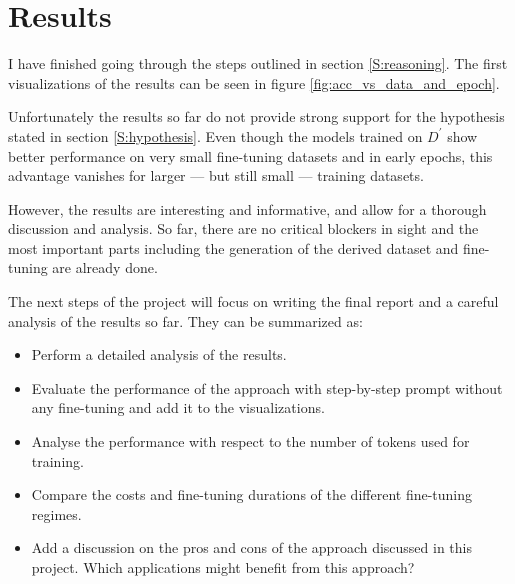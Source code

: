 \documentclass[11pt]{article}
\begin{document}
    \section{Results}

    I have finished going through the steps outlined in section \ref{S:reasoning}.
    The first visualizations of the results can be seen in figure \ref{fig:acc_vs_data_and_epoch}.

    Unfortunately the results so far do not provide strong support for the hypothesis stated in section \ref{S:hypothesis}.
    Even though the models trained on $D^\prime$ show better performance on very small fine-tuning datasets and in early
    epochs, this advantage vanishes for larger --- but still small --- training datasets.

    However, the results are interesting and informative, and allow for a thorough discussion and analysis.
    So far, there are no critical blockers in sight and the most important parts including the generation of the derived
    dataset and fine-tuning are already done.

    The next steps of the project will focus on writing the final report and a careful analysis of the results so far.
    They can be summarized as:
    \begin{itemize}
        \item Perform a detailed analysis of the results.
        \item Evaluate the performance of the approach with step-by-step prompt without any fine-tuning
        and add it to the visualizations.
        \item Analyse the performance with respect to the number of tokens used for training.
        \item Compare the costs and fine-tuning durations of the different fine-tuning regimes.
        \item Add a discussion on the pros and cons of the approach discussed in this project. Which applications might
        benefit from this approach?
    \end{itemize}
\end{document}
